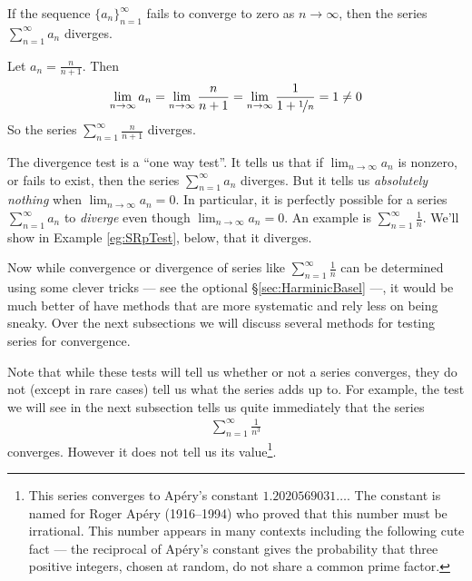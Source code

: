\begin{theorem}\label{thm:SRdivergenceTest}
If the sequence $\big\{a_n\big\}_{n=1}^\infty$ fails to converge to zero
as $n\rightarrow\infty$, then the series $\sum_{n=1}^\infty a_n$ diverges.
\end{theorem}

\begin{eg}\label{eg:SRdivTest}
Let $a_n=\frac{n}{n+1}$. Then
\begin{equation*}
\lim_{n\rightarrow\infty} a_n
=\lim_{n\rightarrow\infty}\frac{n}{n+1}
=\lim_{n\rightarrow\infty}\frac{1}{1+\nicefrac{1}{n}}
=1\ne 0
\end{equation*}
So the series $\sum_{n=1}^\infty \frac{n}{n+1}$ diverges.

\end{eg}

\begin{warning}\label{wrn:SRdivTest}
The divergence test is a ``one way test''. It tells us that if
$\lim_{n\rightarrow\infty}a_n$ is nonzero, or fails to exist, then
the series $\sum_{n=1}^\infty a_n$ diverges. But it tells us \emph{absolutely
nothing} when $\lim_{n\rightarrow\infty}a_n=0$. In particular, it is perfectly
possible for a series $\sum_{n=1}^\infty a_n$ to \emph{diverge} even
though  $\lim_{n\rightarrow\infty}a_n=0$.
An example is $\sum_{n=1}^\infty \frac{1}{n}$. We'll show in Example
\ref{eg:SRpTest}, below, that it diverges.
\end{warning}


Now while convergence or divergence of series like
$\sum_{n=1}^\infty \frac{1}{n}$ can be determined using some
clever tricks --- see the optional \S\ref{sec:HarminicBasel} ---,
it would be much better of have methods that are more systematic and
rely less on being sneaky. Over the next subsections we will discuss
several methods for testing series for convergence.


Note that while these tests will tell us whether or not a series
converges, they do not (except in rare cases) tell us what the
series adds up to. For example, the test we will
see in the next subsection tells us quite immediately that the series
\begin{align*}
  \sum_{n=1}^\infty \frac{1}{n^3}
\end{align*}
converges. However it does not tell us its value\footnote{This series
converges to Ap\'ery's constant $1.2020569031\dots$. The constant is
named for Roger Ap\'ery (1916--1994) who proved that this number must be irrational. This number appears in many contexts including the following
cute fact --- the reciprocal of Ap\'ery's constant gives the probability
that three positive integers, chosen at random, do not share
a common prime factor.}.


